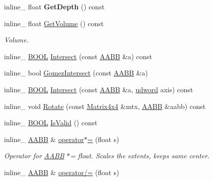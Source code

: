 \begin{DoxyCompactItemize}
\item 
inline\+\_\+ float {\bfseries Get\+Depth} () const \hypertarget{classOpcode_1_1AABB_a4f4f096614a9cc74065d4e985326e7de}{}\label{classOpcode_1_1AABB_a4f4f096614a9cc74065d4e985326e7de}

\item 
inline\+\_\+ float \hyperlink{classOpcode_1_1AABB_a48f0f94aca074e5e0c075dfb4c188e6c}{Get\+Volume} () const \hypertarget{classOpcode_1_1AABB_a48f0f94aca074e5e0c075dfb4c188e6c}{}\label{classOpcode_1_1AABB_a48f0f94aca074e5e0c075dfb4c188e6c}

\begin{DoxyCompactList}\small\item\em Volume. \end{DoxyCompactList}\item 
inline\+\_\+ \hyperlink{IceTypes_8h_a050c65e107f0c828f856a231f4b4e788}{B\+O\+OL} \hyperlink{classOpcode_1_1AABB_a2e8a66919a32819076a118097449bba4}{Intersect} (const \hyperlink{classOpcode_1_1AABB}{A\+A\+BB} \&a) const 
\item 
inline\+\_\+ bool \hyperlink{classOpcode_1_1AABB_a6e99cceccfb17187fbfeff396f35e72b}{Gomez\+Intersect} (const \hyperlink{classOpcode_1_1AABB}{A\+A\+BB} \&a)
\item 
inline\+\_\+ \hyperlink{IceTypes_8h_a050c65e107f0c828f856a231f4b4e788}{B\+O\+OL} \hyperlink{classOpcode_1_1AABB_ac637f7ff897553ab3221c94f8b6bff51}{Intersect} (const \hyperlink{classOpcode_1_1AABB}{A\+A\+BB} \&a, \hyperlink{IceTypes_8h_a44c6f1920ba5551225fb534f9d1a1733}{udword} axis) const 
\item 
inline\+\_\+ void \hyperlink{classOpcode_1_1AABB_a1757edfe1363ddbab5be20c8264dd14e}{Rotate} (const \hyperlink{classOpcode_1_1Matrix4x4}{Matrix4x4} \&mtx, \hyperlink{classOpcode_1_1AABB}{A\+A\+BB} \&aabb) const 
\item 
inline\+\_\+ \hyperlink{IceTypes_8h_a050c65e107f0c828f856a231f4b4e788}{B\+O\+OL} \hyperlink{classOpcode_1_1AABB_a227e86486c6611f9154955363f569aaa}{Is\+Valid} () const 
\item 
inline\+\_\+ \hyperlink{classOpcode_1_1AABB}{A\+A\+BB} \& \hyperlink{classOpcode_1_1AABB_a9711deef52caaf24923a3574c6f88f09}{operator$\ast$=} (float s)\hypertarget{classOpcode_1_1AABB_a9711deef52caaf24923a3574c6f88f09}{}\label{classOpcode_1_1AABB_a9711deef52caaf24923a3574c6f88f09}

\begin{DoxyCompactList}\small\item\em Operator for \hyperlink{classOpcode_1_1AABB}{A\+A\+BB} $\ast$= float. Scales the extents, keeps same center. \end{DoxyCompactList}\item 
inline\+\_\+ \hyperlink{classOpcode_1_1AABB}{A\+A\+BB} \& \hyperlink{classOpcode_1_1AABB_aec4b3f09ae8c54b4201a43e4f8d1756e}{operator/=} (float s)\hypertarget{classOpcode_1_1AABB_aec4b3f09ae8c54b4201a43e4f8d1756e}{}\label{classOpcode_1_1AABB_aec4b3f09ae8c54b4201a43e4f8d1756e}


\end{DoxyCompactItemize}
